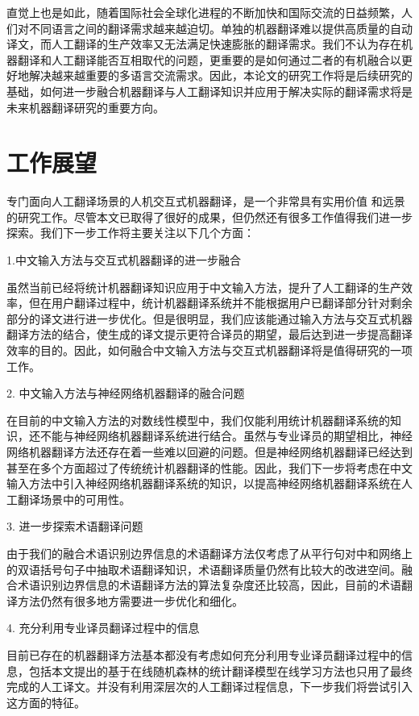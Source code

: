 直觉上也是如此，随着国际社会全球化进程的不断加快和国际交流的日益频繁，人们对不同语言之间的翻译需求越来越迫切。单独的机器翻译难以提供高质量的自动译文，而人工翻译的生产效率又无法满足快速膨胀的翻译需求。我们不认为存在机器翻译和人工翻译能否互相取代的问题，更重要的是如何通过二者的有机融合以更好地解决越来越重要的多语言交流需求。因此，本论文的研究工作将是后续研究的基础，如何进一步融合机器翻译与人工翻译知识并应用于解决实际的翻译需求将是未来机器翻译研究的重要方向。

\section{工作展望}

专门面向人工翻译场景的人机交互式机器翻译，是一个非常具有实用价值 和远景的研究工作。尽管本文已取得了很好的成果，但仍然还有很多工作值得我们进一步探索。我们下一步工作将主要关注以下几个方面：

1.中文输入方法与交互式机器翻译的进一步融合

虽然当前已经将统计机器翻译知识应用于中文输入方法，提升了人工翻译的生产效率，但在用户翻译过程中，统计机器翻译系统并不能根据用户已翻译部分针对剩余部分的译文进行进一步优化。但是很明显，我们应该能通过输入方法与交互式机器翻译方法的结合，使生成的译文提示更符合译员的期望，最后达到进一步提高翻译效率的目的。因此，如何融合中文输入方法与交互式机器翻译将是值得研究的一项工作。

2. 中文输入方法与神经网络机器翻译的融合问题

在目前的中文输入方法的对数线性模型中，我们仅能利用统计机器翻译系统的知识，还不能与神经网络机器翻译系统进行结合。虽然与专业译员的期望相比，神经网络机器翻译方法还存在着一些难以回避的问题。但是神经网络机器翻译已经达到甚至在多个方面超过了传统统计机器翻译的性能。因此，我们下一步将考虑在中文输入方法中引入神经网络机器翻译系统的知识，以提高神经网络机器翻译系统在人工翻译场景中的可用性。

3. 进一步探索术语翻译问题

由于我们的融合术语识别边界信息的术语翻译方法仅考虑了从平行句对中和网络上的双语括号句子中抽取术语翻译知识，术语翻译质量仍然有比较大的改进空间。融合术语识别边界信息的术语翻译方法的算法复杂度还比较高，因此，目前的术语翻译方法仍然有很多地方需要进一步优化和细化。

4. 充分利用专业译员翻译过程中的信息

目前已存在的机器翻译方法基本都没有考虑如何充分利用专业译员翻译过程中的信息，包括本文提出的基于在线随机森林的统计翻译模型在线学习方法也只用了最终完成的人工译文。并没有利用深层次的人工翻译过程信息，下一步我们将尝试引入这方面的特征。


